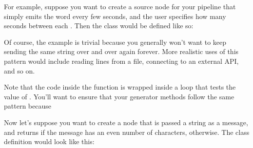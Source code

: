 \documentclass[letterpaper,10pt,english]{sphinxmanual}
\begin{document}
For example, suppose you want to create a source node for your pipeline
that simply emits the word  every few seconds, and the user
specifies how many seconds between each . Then the class would be
defined like so:

%
\begin{sphinxVerbatim}[commandchars=\\\{\}]
   
       
          
          
           

     
         
               
\end{sphinxVerbatim}

Of course, the example is trivial because you generally won’t want to
keep sending the same string over and over again forever. More realistic
uses of this pattern would include reading lines from a file, connecting
to an external API, and so on.

Note that the code inside the  function is wrapped inside a
 loop that tests the value of . You’ll
want to ensure that your generator methods follow the same pattern because

Now let’s suppose you want to create a node that is passed a string as a
message, and returns  if the message has an even number of
characters,  otherwise. The class definition would look like
this:
\end{document}
